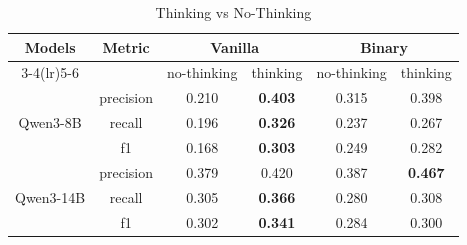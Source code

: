 \begin{table}[htbp]
  \centering
  \small
  \caption{Thinking vs No-Thinking}
  \label{tab:model_prompt_thinking}
  \setlength{\tabcolsep}{4pt}
  \renewcommand{\arraystretch}{1.15}
  \begin{tabular}{c c c c c c}
    \toprule
    \multirow{2}{*}{Models} & \multirow{2}{*}{Metric} & \multicolumn{2}{c}{Vanilla} & \multicolumn{2}{c}{Binary} \\
    \cmidrule(lr){3-4}\cmidrule(lr){5-6}
    & & no-thinking & thinking & no-thinking & thinking \\
    \midrule
    \multirow{3}{*}{Qwen3-8B} & precision & 0.210 & \textbf{0.403} & 0.315 & 0.398 \\
    & recall & 0.196 & \textbf{0.326} & 0.237 & 0.267 \\
    & f1 & 0.168 & \textbf{0.303} & 0.249 & 0.282 \\
    \midrule
    \multirow{3}{*}{Qwen3-14B} & precision & 0.379 & 0.420 & 0.387 & \textbf{0.467} \\
    & recall & 0.305 & \textbf{0.366} & 0.280 & 0.308 \\
    & f1 & 0.302 & \textbf{0.341} & 0.284 & 0.300 \\
    \bottomrule
  \end{tabular}%
\end{table}